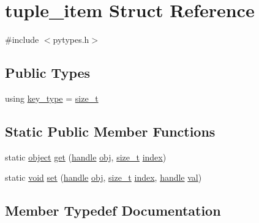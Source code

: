 \hypertarget{structtuple__item}{}\section{tuple\+\_\+item Struct Reference}
\label{structtuple__item}


{\ttfamily \#include $<$pytypes.\+h$>$}

\subsection*{Public Types}
\begin{DoxyCompactItemize}
\item 
using \mbox{\hyperlink{structtuple__item_ac6a1e89372fbb8f9f84cf99a012a02ed}{key\+\_\+type}} = \mbox{\hyperlink{detail_2common_8h_a801d6a451a01953ef8cbae6feb6a3638}{size\+\_\+t}}
\end{DoxyCompactItemize}
\subsection*{Static Public Member Functions}
\begin{DoxyCompactItemize}
\item 
static \mbox{\hyperlink{classobject}{object}} \mbox{\hyperlink{structtuple__item_af80c59a378316fae1a31338a953786f7}{get}} (\mbox{\hyperlink{classhandle}{handle}} \mbox{\hyperlink{_s_d_l__opengl__glext_8h_a0c0d4701a6c89f4f7f0640715d27ab26}{obj}}, \mbox{\hyperlink{detail_2common_8h_a801d6a451a01953ef8cbae6feb6a3638}{size\+\_\+t}} \mbox{\hyperlink{_s_d_l__opengl__glext_8h_a57f14e05b1900f16a2da82ade47d0c6d}{index}})
\item 
static \mbox{\hyperlink{_s_d_l__opengles2__gl2ext_8h_ae5d8fa23ad07c48bb609509eae494c95}{void}} \mbox{\hyperlink{structtuple__item_aeecd66f2a8b6a24b240e54e09d208006}{set}} (\mbox{\hyperlink{classhandle}{handle}} \mbox{\hyperlink{_s_d_l__opengl__glext_8h_a0c0d4701a6c89f4f7f0640715d27ab26}{obj}}, \mbox{\hyperlink{detail_2common_8h_a801d6a451a01953ef8cbae6feb6a3638}{size\+\_\+t}} \mbox{\hyperlink{_s_d_l__opengl__glext_8h_a57f14e05b1900f16a2da82ade47d0c6d}{index}}, \mbox{\hyperlink{classhandle}{handle}} \mbox{\hyperlink{_s_d_l__opengl__glext_8h_a26942fd2ed566ef553eae82d2c109c8f}{val}})
\end{DoxyCompactItemize}


\subsection{Member Typedef Documentation}
\mbox{\label{structtuple__item_ac6a1e89372fbb8f9f84cf99a012a02ed}} 
